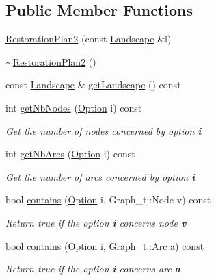 \subsection*{Public Member Functions}
\begin{DoxyCompactItemize}
\item 
\hyperlink{class_restoration_plan2_a9f7a6a7f8421ba8f94601cb00c8effc4}{Restoration\+Plan2} (const \hyperlink{class_landscape}{Landscape} \&l)
\item 
\hyperlink{class_restoration_plan2_ae0f4cdb50c5e051f054a7662b1de91d3}{$\sim$\+Restoration\+Plan2} ()
\item 
const \hyperlink{class_landscape}{Landscape} \& \hyperlink{class_restoration_plan2_a15d5303518cb31378111c8da175dc659}{get\+Landscape} () const
\item 
int \hyperlink{class_restoration_plan2_a300dbff4b8071a136682b5350bb916a2}{get\+Nb\+Nodes} (\hyperlink{class_restoration_plan2_aff164a2726831342bf87af5e11df1064}{Option} i) const
\begin{DoxyCompactList}\small\item\em Get the number of nodes concerned by option {\bfseries i} \end{DoxyCompactList}\item 
int \hyperlink{class_restoration_plan2_a91230a516340063f605ab295ae7f31d3}{get\+Nb\+Arcs} (\hyperlink{class_restoration_plan2_aff164a2726831342bf87af5e11df1064}{Option} i) const
\begin{DoxyCompactList}\small\item\em Get the number of arcs concerned by option {\bfseries i} \end{DoxyCompactList}\item 
bool \hyperlink{class_restoration_plan2_acf5e11d698c3306efeafaa5ca5d6f3ed}{contains} (\hyperlink{class_restoration_plan2_aff164a2726831342bf87af5e11df1064}{Option} i, Graph\+\_\+t\+::\+Node v) const
\begin{DoxyCompactList}\small\item\em Return true if the option {\bfseries i} concerns node {\bfseries v} \end{DoxyCompactList}\item 
bool \hyperlink{class_restoration_plan2_a1884daec27de69af8302b961aee1b232}{contains} (\hyperlink{class_restoration_plan2_aff164a2726831342bf87af5e11df1064}{Option} i, Graph\+\_\+t\+::\+Arc a) const
\begin{DoxyCompactList}\small\item\em Return true if the option {\bfseries i} concerns arc {\bfseries a} \end{DoxyCompactList}\item 

\end{DoxyCompactItemize}
